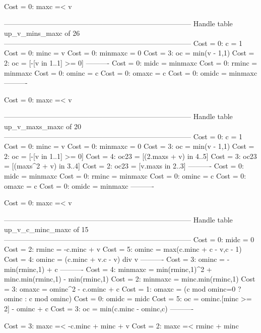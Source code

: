 Cost =  0:  maxc =< v

--------------------------------------------------------------------------------
Handle table up_v_mins_maxc of 26
--------------------------------------------------------------------------------
Cost =  0:  c       = 1
Cost =  0:  minc    = v
Cost =  0:  minmaxc = 0
Cost =  3:  oc      = min(v - 1,1)
Cost =  2:  oc      = [-[v in 1..1] >= 0]
----------
Cost =  0:  midc    = minmaxc
Cost =  0:  rminc   = minmaxc
Cost =  0:  ominc   = c
Cost =  0:  omaxc   = c
Cost =  0:  omidc   = minmaxc
----------

Cost =  0:  maxc =< v

--------------------------------------------------------------------------------
Handle table up_v_maxs_maxc of 20
--------------------------------------------------------------------------------
Cost =  0:  c       = 1
Cost =  0:  minc    = v
Cost =  0:  minmaxc = 0
Cost =  3:  oc      = min(v - 1,1)
Cost =  2:  oc      = [-[v in 1..1] >= 0]
Cost =  4:  oc23    = [(2.maxs + v) in 4..5]
Cost =  3:  oc23    = [(maxs^2 + v) in 3..4]
Cost =  2:  oc23    = [v.maxs in 2..3]
----------
Cost =  0:  midc    = minmaxc
Cost =  0:  rminc   = minmaxc
Cost =  0:  ominc   = c
Cost =  0:  omaxc   = c
Cost =  0:  omidc   = minmaxc
----------

Cost =  0:  maxc =< v

--------------------------------------------------------------------------------
Handle table up_v_c_minc_maxc of 15
--------------------------------------------------------------------------------
Cost =  0:  midc    = 0
Cost =  2:  rminc   = -c.minc + v
Cost =  5:  ominc   = max(c.minc + c - v,c - 1)
Cost =  4:  ominc   = (c.minc + v.c - v) div v
----------
Cost =  3:  ominc   = -min(rminc,1) + c
----------
Cost =  4:  minmaxc = min(rminc,1)^2 + minc.min(rminc,1) - min(rminc,1)
Cost =  2:  minmaxc = minc.min(rminc,1)
Cost =  3:  omaxc   = ominc^2 - c.ominc + c
Cost =  1:  omaxc   = (c mod ominc=0 ? ominc : c mod ominc)
Cost =  0:  omidc   = midc
Cost =  5:  oc      = ominc.[minc >= 2] - ominc + c
Cost =  3:  oc      = min(c.minc - ominc,c)
----------

Cost =  3:  maxc =< -c.minc + minc + v
Cost =  2:  maxc =< rminc + minc

